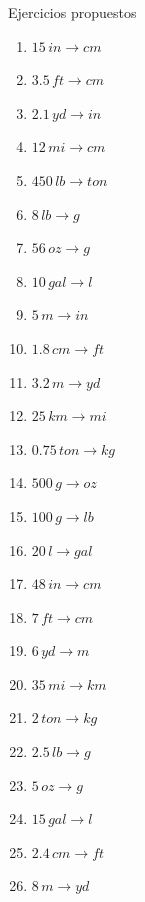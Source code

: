 \begin{frame}{Ejercicios propuestos}
    \begin{multicols}{3}
    \begin{enumerate}
    \item $\num{15} \,\unit{in}\rightarrow\unit{cm}$
    \item $\num{3.5} \,\unit{ft}\rightarrow\unit{cm}$
    \item $\num{2.1} \,\unit{yd}\rightarrow\unit{in}$
    \item $\num{12} \,\unit{mi}\rightarrow\unit{cm}$
    \item $\num{450} \,\unit{lb}\rightarrow\unit{ton}$
    \item $\num{8} \,\unit{lb}\rightarrow\unit{g}$
    \item $\num{56} \,\unit{oz}\rightarrow\unit{g}$
    \item $\num{10} \,\unit{gal}\rightarrow\unit{l}$
    \item $\num{5} \,\unit{m}\rightarrow\unit{in}$
    \item $\num{1.8} \,\unit{cm}\rightarrow\unit{ft}$
    \item $\num{3.2} \,\unit{m}\rightarrow\unit{yd}$
    \item $\num{25} \,\unit{km}\rightarrow\unit{mi}$
    \item $\num{0.75} \,\unit{ton}\rightarrow\unit{kg}$
    \item $\num{500} \,\unit{g}\rightarrow\unit{oz}$
    \item $\num{100} \,\unit{g}\rightarrow\unit{lb}$
    \item $\num{20} \,\unit{l}\rightarrow\unit{gal}$
    \item $\num{48} \,\unit{in}\rightarrow\unit{cm}$
    \item $\num{7} \,\unit{ft}\rightarrow\unit{cm}$
    \item $\num{6} \,\unit{yd}\rightarrow\unit{m}$
    \item $\num{35} \,\unit{mi}\rightarrow\unit{km}$
    \item $\num{2} \,\unit{ton}\rightarrow\unit{kg}$
    \item $\num{2.5} \,\unit{lb}\rightarrow\unit{g}$
    \item $\num{5} \,\unit{oz}\rightarrow\unit{g}$
    \item $\num{15} \,\unit{gal}\rightarrow\unit{l}$
    \item $\num{2.4} \,\unit{cm}\rightarrow\unit{ft}$
    \item $\num{8} \,\unit{m}\rightarrow\unit{yd}$

\end{enumerate}
\end{multicols}
\end{frame}
